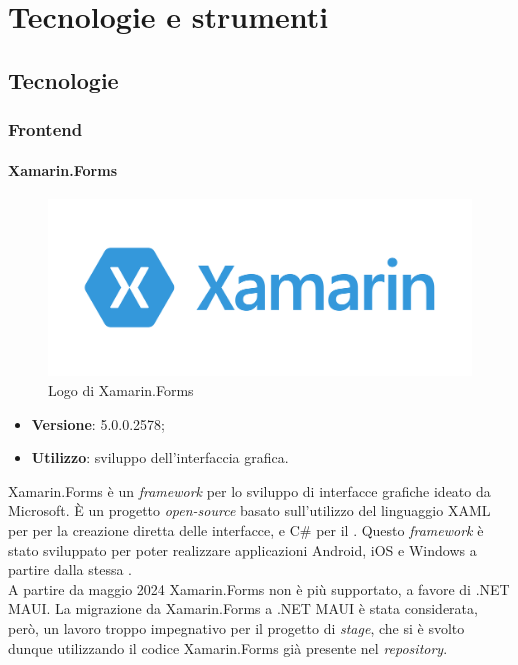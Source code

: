 \chapter{Tecnologie e strumenti}
\label{cap:tecnologie-strumenti}


\section{Tecnologie}

\subsection{Frontend}

\subsubsection{Xamarin.Forms}

\begin{figure}[H]
    \centering 
    \includegraphics[width=0.4\columnwidth]{images/loghi/xamarin-logo.png} 
    \caption{Logo di Xamarin.Forms}
\end{figure}

\begin{itemize}
    \item \textbf{Versione}: 5.0.0.2578;
    \item \textbf{Utilizzo}: sviluppo dell'interfaccia grafica.
\end{itemize}

\noindent Xamarin.Forms è un \textit{framework} per lo sviluppo di interfacce grafiche ideato da Microsoft. È un progetto \textit{open-source} basato sull'utilizzo del linguaggio XAML per per la creazione diretta delle interfacce, e C\# per il \textit{}. Questo \textit{framework} è stato sviluppato per poter realizzare applicazioni Android, iOS e Windows a partire dalla stessa \textit{}.\\
A partire da maggio 2024 Xamarin.Forms non è più supportato, a favore di .NET MAUI. La migrazione da Xamarin.Forms a .NET MAUI è stata considerata, però, un lavoro troppo impegnativo per il progetto di \textit{stage}, che si è svolto dunque utilizzando il codice Xamarin.Forms già presente nel \textit{repository}.

